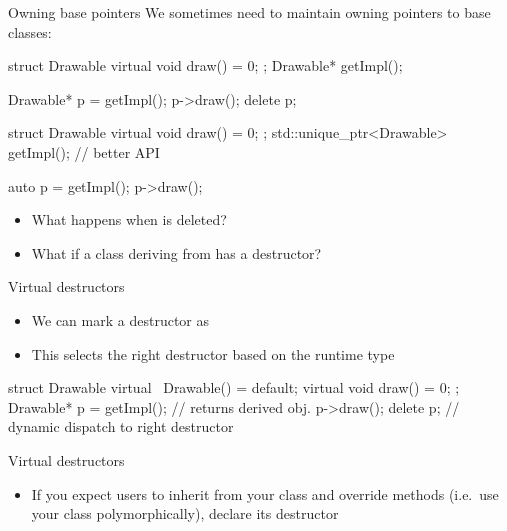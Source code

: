 \begin{frame}[fragile]
  \begin{block}{Owning base pointers}
    We sometimes need to maintain owning pointers to base classes:
  \end{block}
  \begin{overprint}
  \begin{cppcode}
    struct Drawable {
       virtual void draw() = 0;
    };
    Drawable* getImpl();

    Drawable* p = getImpl();
    p->draw();
    delete p;
  \end{cppcode}
  \begin{cppcode}
    struct Drawable {
       virtual void draw() = 0;
    };
    std::unique_ptr<Drawable> getImpl(); // better API

    auto p = getImpl();
    p->draw();
  \end{cppcode}
  \end{overprint}
  \begin{block}{}
    \begin{itemize}
      \item What happens when  is deleted?
      \item What if a class deriving from  has a destructor?
    \end{itemize}
  \end{block}
\end{frame}

\begin{frame}[fragile]
  \begin{block}{Virtual destructors}
    \begin{itemize}
    \item We can mark a destructor as 
    \item This selects the right destructor based on the runtime type
    \end{itemize}
  \end{block}
  \begin{cppcode}
    struct Drawable {
       virtual ~Drawable() = default;
       virtual void draw() = 0;
    };
    Drawable* p = getImpl(); // returns derived obj.
    p->draw();
    delete p; // dynamic dispatch to right destructor
  \end{cppcode}
  \begin{goodpractice}{Virtual destructors}
    \begin{itemize}
      \item If you expect users to inherit from your class and override methods (i.e.\ use your class polymorphically), declare its destructor 
    \end{itemize}
  \end{goodpractice}
\end{frame}

